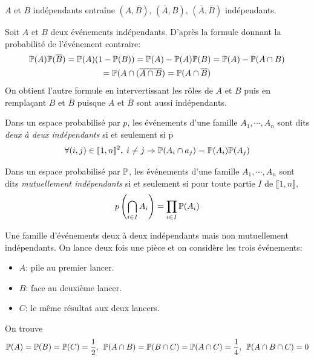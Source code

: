 \begin{prop}
  $A$ et $B$ indépendants entraîne $(A,\overline{B})$, $(\overline{A},B)$, $(\overline{A},\overline{B})$ indépendants.
\end{prop}
\begin{demo}
Soit $A$ et $B$ deux événements indépendants. D'après la formule donnant la probabilité de l'événement contraire:
\begin{multline*}
  \mathbb{P}(A)\mathbb{P}(\overline{B})=\mathbb{P}(A)(1-\mathbb{P}(B)) = \mathbb{P}(A) - \mathbb{P}(A)\mathbb{P}(B) = \mathbb{P}(A) - \mathbb{P}(A\cap B)\\
  = \mathbb{P}(A \cap (\overline{A\cap B}) = \mathbb{P}(A \cap \overline{B})
\end{multline*}
On obtient l'autre formule en intervertissant les rôles de $A$ et $B$ puis en remplaçant $B$ et $\overline{B}$ puisque $A$ et $\overline{B}$ sont aussi indépendants.
\end{demo}
\begin{defi}
Dans un espace probabilisé par $p$, les événements d'une famille $A_1,\cdots,A_n$ sont dits \emph{deux à deux indépendants} si et seulement si p 
\begin{displaymath}
  \forall (i,j)\in \llbracket 1,n \rrbracket^2,\; i\neq j \Rightarrow \mathbb{P}(A_i \cap a_j) = \mathbb{P}(A_i)\mathbb{P}(A_j)
\end{displaymath}  
\end{defi}

\begin{defi}
Dans un espace probabilisé par $\mathbb{P}$, les événements d'une famille $A_1,\cdots,A_n$ sont dits \emph{mutuellement indépendants} si et seulement si pour toute partie $I$ de $\llbracket 1,n \rrbracket$, 
\begin{displaymath}
  p\left( \bigcap_{i\in I}A_i\right)  = \prod_{i\in I}\mathbb{P}(A_i)
\end{displaymath}  
\end{defi}
\clearpage
\begin{exple}
  Une famille d'événements deux à deux indépendants mais non mutuellement indépendants.\newline
On lance deux fois une pièce et on considère les trois événements:
\begin{itemize}
  \item $A$: pile au premier lancer.
  \item $B$: face au deuxième lancer.
  \item $C$: le même résultat aux deux lancers.
\end{itemize}
On trouve 
\[
  \mathbb{P}(A)= \mathbb{P}(B) = \mathbb{P}(C) = \frac{1}{2},\hspace{0.15cm} \mathbb{P}(A\cap B)= \mathbb{P}(B \cap C) = \mathbb{P}(A \cap C) = \frac{1}{4},\hspace{0.15cm} \mathbb{P}(A \cap B \cap C) = 0
\]
\end{exple}



